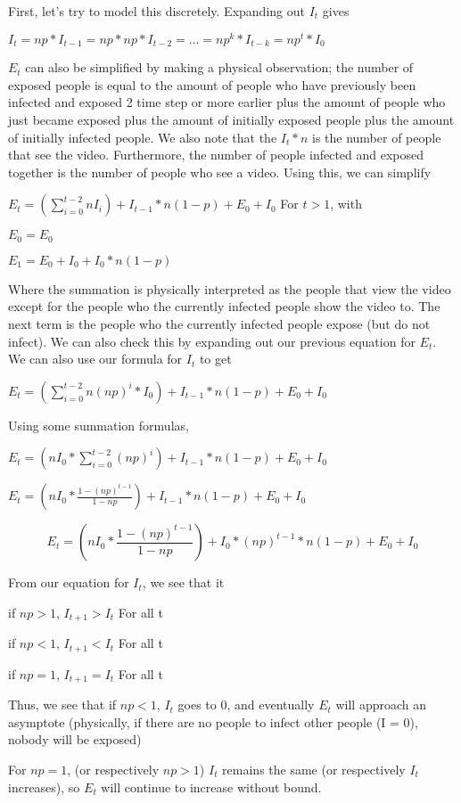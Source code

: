 \documentclass{article}
\begin{document}
First, let's try to model this discretely. Expanding out $I_{t}$ gives

$I_{t}=np*I_{t-1}=np*np*I_{t-2}=...=np^k*I_{t-k}=np^t*I_0$

$E_t$ can also be simplified by making a physical observation; the number of exposed people is equal to the amount of people who have previously been infected and exposed 2 time step or more earlier plus the amount of people who just became exposed plus the amount of initially exposed people plus the amount of initially infected people. We also note that the $I_t*n$ is the number of people that see the video. Furthermore, the number of people infected and exposed together is the number of people who see a video. Using this, we can simplify 

$E_t=(\sum_{i=0}^{t-2}nI_i)+I_{t-1}*n(1-p)+E_0+I_0$ For $t > 1$, with 

$E_0 = E_0$

$E_1 = E_0+I_0+I_0*n(1-p)$

Where the summation is physically interpreted as the people that view the video except for the people who the currently infected people show the video to. The next term is the people who the currently infected people expose (but do not infect). We can also check this by expanding out our previous equation for $E_t$. We can also use our formula for $I_t$ to get

$E_t=(\sum_{i=0}^{t-2}n(np)^i*I_0)+I_{t-1}*n(1-p)+E_0+I_0$

Using some summation formulas, 

$E_t=(nI_0*\sum_{i=0}^{t-2}(np)^i)+I_{t-1}*n(1-p)+E_0+I_0$

$E_t=(nI_0*\frac{1-(np)^{t-1}}{1-np})+I_{t-1}*n(1-p)+E_0+I_0$

$$E_t=(nI_0*\frac{1-(np)^{t-1}}{1-np})+I_0*(np)^{t-1}*n(1-p)+E_0+I_0$$

From our equation for $I_t$, we see that it 

if $np > 1$, $I_{t+1} > I_t$ For all t

if $np < 1$, $I_{t+1} < I_t$ For all t

if $np = 1$, $I_{t+1} = I_t$ For all t

Thus, we see that if $np < 1$, $I_t$ goes to 0, and eventually $E_t$ will approach an asymptote (physically, if there are no people to infect other people (I = 0), nobody will be exposed)

For $np = 1$, (or respectively $np > 1$) $I_t$ remains the same (or respectively $I_t$ increases), so $E_t$ will continue to increase without bound. 
\end{document}
